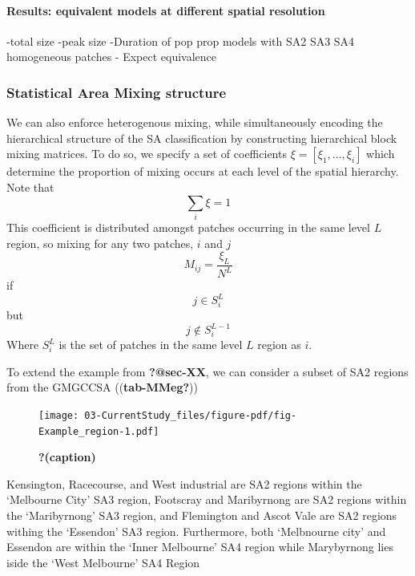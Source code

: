 \documentclass[
  letterpaper,
  DIV=11,
  numbers=noendperiod]{scrreprt}
\let\oldparagraph\paragraph
\renewcommand{\paragraph}[1]{\oldparagraph{#1}\mbox{}}
\begin{document}
\hypertarget{results-equivalent-models-at-different-spatial-resolution}{%
\paragraph{Results: equivalent models at different spatial
resolution}\label{results-equivalent-models-at-different-spatial-resolution}}

-total size -peak size -Duration of pop prop models with SA2 SA3 SA4
homogeneous patches - Expect equivalence

\hypertarget{statistical-area-mixing-structure}{%
\subsubsection{Statistical Area Mixing
structure}\label{statistical-area-mixing-structure}}

We can also enforce heterogenous mixing, while simultaneously encoding
the hierarchical structure of the SA classification by constructing
hierarchical block mixing matrices. To do so, we specify a set of
coefficients \(\xi = [\xi_1, ..., \xi_i]\) which determine the
proportion of mixing occurs at each level of the spatial hierarchy. Note
that \[
\sum\limits_{i}\xi=1
\] This coefficient is distributed amongst patches occurring in the same
level \(L\) region, so mixing for any two patches, \(i\) and \(j\) \[
M_{ij}= \frac{\xi_{L}}{N^{L}} 
\] if \[
j \in S_{i}^{L}
\] but \[j \notin S_{i}^{L-1}\] Where \(S_{i}^{L}\) is the set of
patches in the same level \(L\) region as \(i\).

To extend the example from \textbf{?@sec-XX}, we can consider a subset
of SA2 regions from the GMGCCSA ((\textbf{tab-MMeg?}))

\begin{figure}

{\centering \texttt{[image: 03-CurrentStudy\_files/figure-pdf/fig-Example\_region-1.pdf]}

}

\caption{\label{fig-Example_region}\textbf{?(caption)}}

\end{figure}

Kensington, Racecourse, and West industrial are SA2 regions within the
`Melbourne City' SA3 region, Footscray and Maribyrnong are SA2 regions
within the `Maribyrnong' SA3 region, and Flemington and Ascot Vale are
SA2 regions withing the `Essendon' SA3 region. Furthermore, both
`Melbnourne city' and Essendon are within the `Inner Melbourne' SA4
region while Marybyrnong lies iside the `West Melbourne' SA4 Region
\end{document}
